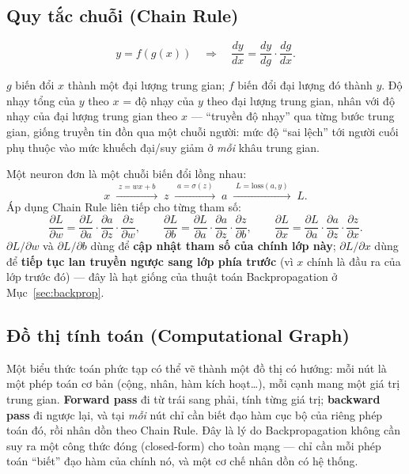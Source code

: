 \documentclass[12pt,a4paper]{report}
\begin{document}
\subsection{Quy tắc chuỗi (Chain Rule)}
\label{sec:chainrule}

$$y = f(g(x)) \quad\Longrightarrow\quad \frac{dy}{dx} = \frac{dy}{dg}\cdot\frac{dg}{dx}.$$

\par\noindent 
$g$ biến đổi $x$ thành một đại lượng trung gian; $f$ biến đổi đại lượng đó
thành $y$. Độ nhạy tổng của $y$ theo $x$ = độ nhạy của $y$ theo đại lượng
trung gian, nhân với độ nhạy của đại lượng trung gian theo $x$ --- ``truyền
độ nhạy'' qua từng bước trung gian, giống truyền tin đồn qua một chuỗi
người: mức độ ``sai lệch'' tới người cuối phụ thuộc vào mức khuếch đại/suy
giảm ở \emph{mỗi} khâu trung gian.
\par

Một neuron đơn là một chuỗi biến đổi lồng nhau:
$$x \;\xrightarrow{\;z=wx+b\;}\; z \;\xrightarrow{\;a=\sigma(z)\;}\; a \;\xrightarrow{\;L=\mathrm{loss}(a,y)\;}\; L.$$
Áp dụng Chain Rule liên tiếp cho từng tham số:
$$\frac{\partial L}{\partial w} = \frac{\partial L}{\partial a}\cdot\frac{\partial a}{\partial z}\cdot\frac{\partial z}{\partial w}, \qquad
\frac{\partial L}{\partial b} = \frac{\partial L}{\partial a}\cdot\frac{\partial a}{\partial z}\cdot\frac{\partial z}{\partial b}, \qquad
\frac{\partial L}{\partial x} = \frac{\partial L}{\partial a}\cdot\frac{\partial a}{\partial z}\cdot\frac{\partial z}{\partial x}.$$
$\partial L/\partial w$ và $\partial L/\partial b$ dùng để \textbf{cập nhật
tham số của chính lớp này}; $\partial L/\partial x$ dùng để \textbf{tiếp
tục lan truyền ngược sang lớp phía trước} (vì $x$ chính là đầu ra của lớp
trước đó) --- đây là hạt giống của thuật toán Backpropagation ở
Mục~\ref{sec:backprop}.

\subsection{Đồ thị tính toán (Computational Graph)}
\label{sec:compgraph}

Một biểu thức toán phức tạp có thể vẽ thành một đồ thị có hướng: mỗi nút là
một phép toán cơ bản (cộng, nhân, hàm kích hoạt\ldots), mỗi cạnh mang một
giá trị trung gian. \textbf{Forward pass} đi từ trái sang phải, tính từng
giá trị; \textbf{backward pass} đi ngược lại, và tại \emph{mỗi} nút chỉ cần
biết đạo hàm cục bộ của riêng phép toán đó, rồi nhân dồn theo Chain Rule.
Đây là lý do Backpropagation không cần suy ra một công thức đóng
(closed-form) cho toàn mạng --- chỉ cần mỗi phép toán ``biết'' đạo hàm của
chính nó, và một cơ chế nhân dồn có hệ thống.
\end{document}
